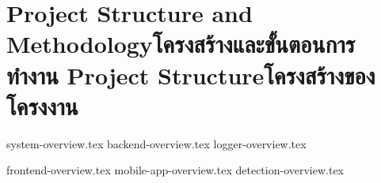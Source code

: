 \chapter{\ifproject%
\ifenglish Project Structure and Methodology\else โครงสร้างและขั้นตอนการทำงาน\fi
\else%
\ifenglish Project Structure\else โครงสร้างของโครงงาน\fi
\fi
}

{system-overview.tex}
{backend-overview.tex}
{logger-overview.tex}

{frontend-overview.tex}
{mobile-app-overview.tex}
{detection-overview.tex}
